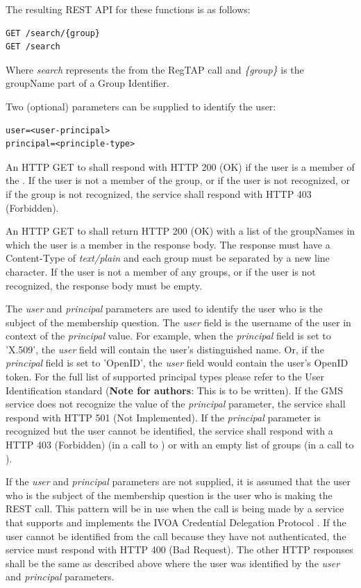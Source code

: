 \documentclass[11pt,a4paper]{ivoa}
\begin{document}
The resulting REST API for these functions is as follows:

\begin{verbatim}
GET /search/{group}
GET /search
\end{verbatim}

Where \emph{search} represents the  from the RegTAP call and \emph{\{group\}} is the groupName part of a Group Identifier.

Two (optional) parameters can be supplied to identify the user:

\begin{verbatim}
user=<user-principal>
principal=<principle-type>
\end{verbatim}

An HTTP GET to  shall respond with HTTP 200 (OK) if the user is a member of the .  If the user is not a member of the group, or if the user is not recognized, or if the group is not recognized, the service shall respond with HTTP 403 (Forbidden).

An HTTP GET to  shall return HTTP 200 (OK) with a list of the groupNames in which the user is a member in the response body.  The response must have a Content-Type of \emph {text/plain} and each group must be separated by a new line character.  If the user is not a member of any groups, or if the user is not recognized, the response body must be empty.

The \emph{user} and \emph{principal} parameters are used to identify the user who is the subject of the membership question.  The \emph{user} field is the username of the user in context of the \emph{principal} value.  For example, when the \emph{principal} field is set to 'X.509', the \emph{user} field will contain the user's distinguished name.  Or, if the \emph{principal} field is set to 'OpenID', the \emph{user} field would contain the user's OpenID token.  For the full list of supported principal types please refer to the User Identification standard (\textbf{Note for authors}: This is to be written).  If the GMS service does not recognize the value of the \emph{principal} parameter, the service shall respond with HTTP 501 (Not Implemented).  If the \emph{principal} parameter is recognized but the user cannot be identified, the service shall respond with a HTTP 403 (Forbidden) (in a call to  ) or with an empty list of groups (in a call to  ).

If the \emph{user} and \emph{principal} parameters are not supplied, it is assumed that the user who is the subject of the membership question is the user who is making the REST call.  This pattern will be in use when the call is being made by a service that supports and implements the IVOA Credential Delegation Protocol \citep{std:CDP}.  If the user cannot be identified from the call because they have not authenticated, the service must respond with HTTP 400 (Bad Request).  The other HTTP responses shall be the same as described above where the user was identified by the \emph{user} and \emph{principal} parameters.
\end{document}
